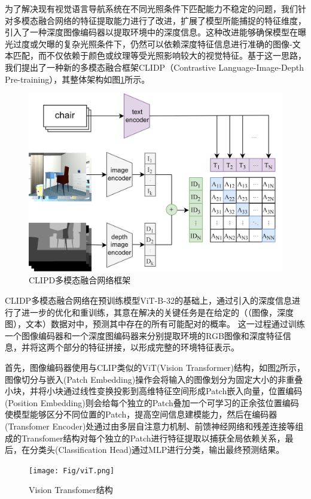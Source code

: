 为了解决现有视觉语言导航系统在不同光照条件下匹配能力不稳定的问题，我们针对多模态融合网络的特征提取能力进行了改进，扩展了模型所能捕捉的特征维度，引入了一种深度图像编码器以提取环境中的深度信息。这种改进能够确保模型在曝光过度或欠曝的复杂光照条件下，仍然可以依赖深度特征信息进行准确的图像-文本匹配，而不仅依赖于颜色或纹理等受光照影响较大的视觉特征。基于这一思路，我们提出了一种新的多模态融合框架CLIDP（Contrastive Language-Image-Depth Pre-training），其整体架构如图\ref{CLIPD_framework}所示。
\begin{figure}[htbp]
    \centering
    \includegraphics[scale=0.09]{Fig/CLIPD_framework.png}
    \caption{\label{CLIPD_framework}CLIPD多模态融合网络框架}
\end{figure}

CLIDP多模态融合网络在预训练模型ViT-B-32\cite{radford2021learning}的基础上，通过引入的深度信息进行了进一步的优化和重训练，其意在解决的关键任务是在给定的（（图像，深度图），文本）数据对中，预测其中存在的所有可能配对的概率。
这一过程通过训练一个图像编码器和一个深度图编码器来分别提取环境的RGB图像和深度特征信息，并将这两个部分的特征拼接，以形成完整的环境特征表示。

首先，图像编码器使用与CLIP类似的ViT(Vision Transformer)结构，如图\ref{viT}所示，图像切分与嵌入(Patch Embedding)操作会将输入的图像划分为固定大小的非重叠小块，并将小块通过线性变换投影到高维特征空间形成Patch嵌入向量，位置编码(Position Embedding)则会给每个独立的Patch叠加一个可学习的正余弦位置编码使模型能够区分不同位置的Patch，提高空间信息建模能力，然后在编码器(Transfomer Encoder)处通过由多层自注意力机制、前馈神经网络和残差连接等组成的Transfomer结构对每个独立的Patch进行特征提取以捕获全局依赖关系，最后，在分类头(Classification Head)通过MLP进行分类，输出最终预测结果。
\begin{figure}[htbp]
    \centering
    \texttt{[image: Fig/viT.png]}
    \caption{\label{viT}Vision Transfomer结构}
\end{figure}

